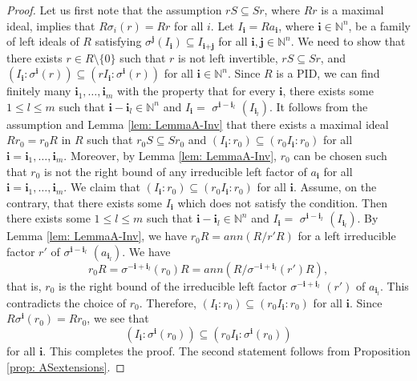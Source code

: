 \documentclass[11pt,a4paper]{article}
\theoremstyle{theorem}
\numberwithin{equation}{section}
\newcommand{\s}{\sigma}
\begin{document}
		\begin{proof}
			Let us first note that  the assumption $rS\subseteq Sr$, where \(Rr\) is a maximal ideal, implies that \(R\s_i(r) = Rr\) for all \(i\). Let  $I_{\textbf{i}}=Ra_{\textbf{i}}$, where $\textbf{i}\in \mathbb{N}^n$, be a family of left ideals of $R$ satisfying  $\s^{\textbf{j}}(I_{\textbf{i}})\subseteq I_{\textbf{i}+\textbf{j}}$ for all $\textbf{i},\textbf{j}\in \mathbb{N}^n$. We need to show that  there exists $r\in R\setminus\{0\}$ such that  \(r\) is not left invertible, 
			$rS\subseteq Sr$, and 
			\((I_{\mathbf{i}}:\s^{\mathbf{i}}(r))\subseteq (rI_{\mathbf{i}}:\s^{\mathbf{i}}(r))\) for all $\mathbf{i}\in \mathbb{N}^n$. Since $R$ is a PID,  we can find finitely many $\textbf{i}_1,\dots,\textbf{i}_m$ with the property that 
			for every $\textbf{i}$, there exists some $1\leq l\leq m$ such that
			 $\textbf{i}- \textbf{i}_l\in\mathbb{N}^n$ and $I_{\textbf{i}}=$ $\s^{\textbf{i}-\textbf{i}_l}$ $(I_{\textbf{i}_l})$.
			It follows from the assumption and Lemma \ref{lem: LemmaA-Inv} that  there exists a  maximal ideal  $Rr_0=r_0R$ in \(R\) such that  
			$r_0S\subseteq Sr_0$ and \((I_{\textbf{i}}:r_0)\subseteq (r_0I_{\textbf{i}}:r_0)\) 	for all $\textbf{i}=\textbf{i}_1,\dots,\textbf{i}_m$. Moreover, by Lemma \ref{lem: LemmaA-Inv}, $r_0$ can be chosen such that $r_0$ is not the right bound of any irreducible left factor of $a_{\textbf{i}}$ for all $\textbf{i}=\textbf{i}_1,\dots,\textbf{i}_m$.  We claim that $(I_{\textbf{i}}:r_0) \subseteq (r_0I_{\textbf{i}}:r_0)$ for all $\textbf{i}$. Assume, on the contrary, that there exists some $I_{\textbf{i}}$ which does not satisfy the condition. Then  there exists some $1\leq l\leq m$ such that
		$\textbf{i}- \textbf{i}_l\in\mathbb{N}^n$ and $I_{\textbf{i}}=$ $\s^{\textbf{i}-\textbf{i}_l}$ $(I_{\textbf{i}_l})$.
		 By Lemma \ref{lem: LemmaA-Inv}, we have 
			$r_0R=ann(R/r'R)$ for a left irreducible factor $r'$ of $\s^{\textbf{i}-\textbf{i}_l}$ $(a_{\textbf{i}_l})$. We have
			\[
				r_0R=\s^{-\textbf{i}+\textbf{i}_l}(r_0)R=ann(R/ \s^{-\textbf{i}+\textbf{i}_l}(r')R),
			\]  
			that is, $r_0$ is the right bound of the irreducible left factor $\s^{-\textbf{i}+\textbf{i}_l}$ $(r')$ of $a_{\textbf{i}_l}$. This contradicts the choice of $r_0$. Therefore,  $(I_{\textbf{i}}:r_0) \subseteq (r_0I_{\textbf{i}}:r_0)$ for all $\textbf{i}$. 	Since \(R\s^{\textbf{i}}(r_0) = Rr_0\), we see that 
			$$(I_{\textbf{i}}:\s^{\textbf{i}}(r_0)) \subseteq (r_0I_{\textbf{i}}:\s^{\textbf{i}}(r_0))$$ 
			for all $\textbf{i}$. This completes the proof. The second statement follows from Proposition \ref{prop: ASextensions}. 
		\end{proof}
\end{document}

